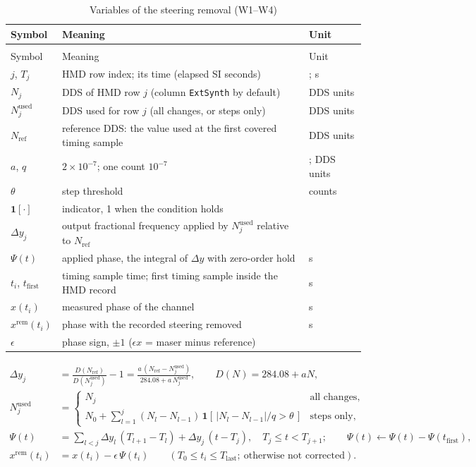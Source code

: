 \documentclass[11pt,a4paper]{article}
\makeatletter
\renewcommand{\_}{\usscore\allowbreak}
\newenvironment{vartable}[2]{%
 \par\small\setlength{\LTpre}{3pt}\setlength{\LTpost}{3pt}%
 \begin{longtable}{@{}>{\raggedright}p{.2\linewidth}>{\raggedright}p{.57\linewidth}>{\raggedright\arraybackslash}p{.17\linewidth}@{}}
 \caption{#2}\label{#1}\\
 \toprule Symbol & Meaning & Unit\\\midrule
 \endfirsthead
 \multicolumn{3}{@{}l}{\footnotesize\itshape Table \thetable{} (continued)}\\
 \toprule Symbol & Meaning & Unit\\\midrule
 \endhead
 \bottomrule
 \endlastfoot}
 {\end{longtable}\normalsize}
\makeatother
\begin{document}
\begin{vartable}{tab:var-W}{Variables of the steering removal (W1--W4)}
\(j\), \(T_j\) & HMD row index; its time (elapsed SI seconds) & 1; s\\
\(N_j\) & DDS of HMD row \(j\) (column \texttt{ExtSynth\_32} by default) & DDS units\\
\(N_j^{\mathrm{used}}\) & DDS used for row \(j\) (all changes, or steps only) & DDS units\\
\(N_{\mathrm{ref}}\) & reference DDS: the value used at the first covered timing sample & DDS units\\
\(a\), \(q\) & \(2\times10^{-7}\); one count \(10^{-7}\) & 1; DDS units\\
\(\theta\) & step threshold & counts\\
\(\mathbf 1[\cdot]\) & indicator, 1 when the condition holds & 1\\
\(\Delta y_j\) & output fractional frequency applied by \(N_j^{\mathrm{used}}\) relative to \(N_{\mathrm{ref}}\) & 1\\
\(\Psi(t)\) & applied phase, the integral of \(\Delta y\) with zero-order hold & s\\
\(t_i\), \(t_{\mathrm{first}}\) & timing sample time; first timing sample inside the HMD record & s\\
\(x(t_i)\) & measured phase of the channel & s\\
\(x^{\mathrm{rem}}(t_i)\) & phase with the recorded steering removed & s\\
\(\epsilon\) & phase sign, \(\pm1\) (\(\epsilon x\) = maser minus reference) & 1\\
\end{vartable}
\begin{align}
\Delta y_j&=\frac{D(N_{\mathrm{ref}})}{D(N_j^{\mathrm{used}})}-1
=\frac{a\,(N_{\mathrm{ref}}-N_j^{\mathrm{used}})}{284.08+a\,N_j^{\mathrm{used}}},\qquad D(N)=284.08+aN, \tag{W1}\label{eq:W1}\\
N_j^{\mathrm{used}}&=\begin{cases}N_j & \text{all changes},\\[2pt]
N_0+\sum_{l=1}^{j}(N_l-N_{l-1})\,\mathbf 1\!\left[\,|N_l-N_{l-1}|/q>\theta\,\right] & \text{steps only},\end{cases} \tag{W2}\label{eq:W2}\\
\Psi(t)&=\sum_{l<j}\Delta y_l\,(T_{l+1}-T_l)+\Delta y_j\,(t-T_j),\quad T_j\le t<T_{j+1};\qquad
\Psi(t)\leftarrow\Psi(t)-\Psi(t_{\mathrm{first}}), \tag{W3}\label{eq:W3}\\
x^{\mathrm{rem}}(t_i)&=x(t_i)-\epsilon\,\Psi(t_i)\qquad (T_0\le t_i\le T_{\mathrm{last}};\ \text{otherwise not corrected}). \tag{W4}\label{eq:W4}
\end{align}
\end{document}
